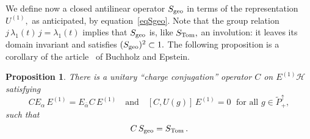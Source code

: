 \documentclass[a4paper,reqno,11pt]{amsart}
\theoremstyle{plain}
\newtheorem{Prop}[Thm]{Proposition}
\theoremstyle{definition}
\numberwithin{equation}{section}
\newcommand{\calH}{{\mathcal H}}
\newcommand{\Potild}{\tilde{P}_+^{\uparrow}}
\newcommand{\unity}{1}
\renewcommand{\sec}{\alpha}
\newcommand{\Stome}{S_{\rm Tom}} %
\newcommand{\Sgeo}{S_{\rm geo}}
\newcommand{\Sgeoe}{S_{\rm geo}}  %
\newcommand{\Ue}{U^{(1)}}
\newcommand{\Ee}{E^{(1)}}
\newcommand{\Cop}{C}        %
\begin{document}
We define now a closed antilinear operator $\Sgeoe$ in terms of the 
representation $\Ue,$ as anticipated, by equation~\eqref{eqSgeo}. 
Note that the group relation $j\,\lambda_1(t) \,j=\lambda_1(t)$ implies that
$\Sgeoe$ is, like $\Stome,$ an involution: it leaves its domain
invariant and satisfies $(\Sgeoe)^2\subset\unity.$ 
The following proposition is a corollary  of the 
article~\cite{BuEp} of Buchholz and Epstein. 
\begin{Prop}  \label{PropBuEp}
There is a unitary ``charge conjugation'' operator $\Cop$ on $\Ee\calH$ 
satisfying 
\begin{equation} \label{eqCop}
  \Cop E_\sec \,\Ee = E_{\bar\sec} \Cop \,\Ee \quad \text{and}\quad
  [\Cop,U(g)]\,\Ee=0\;\text{ for all }g\in\Potild,
\end{equation}
such that 
\begin{equation} \label{eqCSS}
  \Cop \, \Sgeo =\Stome\,.
\end{equation}
\end{Prop}
\end{document}
